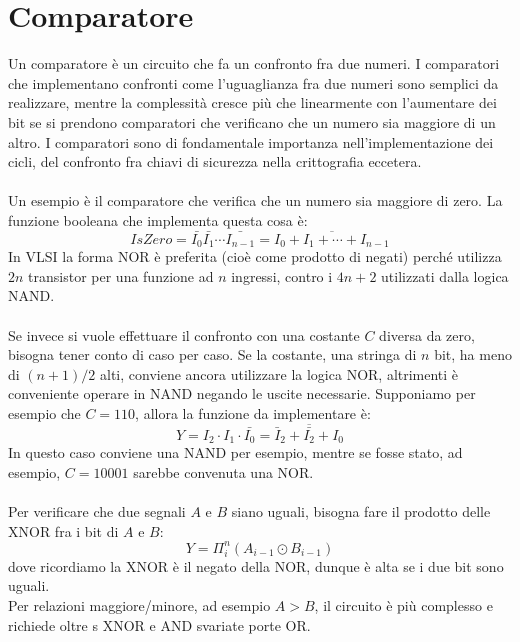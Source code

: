 \documentclass{book}
\begin{document}
    \section{Comparatore}
        Un comparatore è un circuito che fa un confronto fra due numeri. I comparatori che implementano confronti come l'uguaglianza fra due numeri sono semplici da realizzare, mentre la complessità cresce più che linearmente con l'aumentare dei bit se si prendono comparatori che verificano che un numero sia maggiore di un altro. I comparatori sono di fondamentale importanza nell'implementazione dei cicli, del confronto fra chiavi di sicurezza nella crittografia eccetera. \\ \\
        Un esempio è il comparatore che verifica che un numero sia maggiore di zero. La funzione booleana che implementa questa cosa è:
        \begin{equation}
            IsZero = \bar{I_{0}}\bar{I_{1}} \cdots \bar{I_{n-1}} = \overline{I_{0}+I_{1}+ \cdots + I_{n-1}}
        \end{equation}
        In VLSI la forma NOR è preferita (cioè come prodotto di negati) perché utilizza $2n$ transistor per una funzione ad $n$ ingressi, contro i $4n+2$ utilizzati dalla logica NAND. \\ \\
        Se invece si vuole effettuare il confronto con una costante $C$ diversa da zero, bisogna tener conto di caso per caso. Se la costante, una stringa di $n$ bit, ha meno di $(n+1)/2$ alti, conviene ancora utilizzare la logica NOR, altrimenti è conveniente operare in NAND negando le uscite necessarie. Supponiamo per esempio che $C=110$, allora la funzione da implementare è:
        \begin{equation}
            Y = I_{2}\cdot I_{1} \cdot \bar{I_{0}} = \overline{\bar{I}_{2}+\bar{I_{2}} +I_{0}}
        \end{equation}
        In questo caso conviene una NAND per esempio, mentre se fosse stato, ad esempio, $C=10001$ sarebbe convenuta una NOR. \\ \\
        Per verificare che due segnali $A$ e $B$ siano uguali, bisogna fare il prodotto delle XNOR fra i bit di $A$ e $B$:
        \begin{equation}
            Y = \Pi _{i} ^{n} (A_{i-1} \odot B_{i-1})
        \end{equation}
        dove ricordiamo la XNOR è il negato della NOR, dunque è alta se i due bit sono uguali.\\
        Per relazioni maggiore/minore, ad esempio $A>B$, il circuito è più complesso e richiede oltre s XNOR e AND svariate porte OR.
\end{document}

